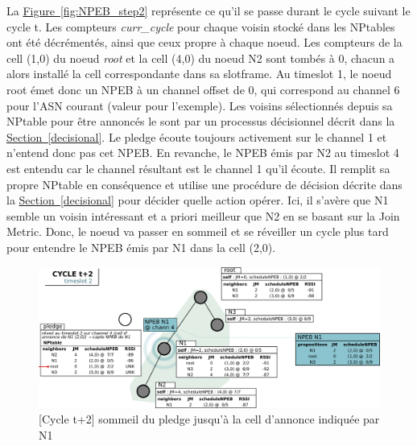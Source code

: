 \documentclass[]{report}
\newcommand{\wordlink}[2]{\hyperref[#2]{#1~\ref{#2}}}
\begin{document}
\newpage

La \wordlink{Figure}{fig:NPEB_step2} représente ce qu'il se passe durant le cycle suivant le cycle t. Les compteurs \textit{curr\_cycle} pour chaque voisin stocké dans les NPtables ont été décrémentés, ainsi que ceux propre à chaque noeud. Les compteurs de la cell (1,0) du noeud \textit{root} et la cell (4,0) du noeud N2 sont tombés à 0, chacun a alors installé la cell correspondante dans sa slotframe. Au timeslot 1, le noeud root émet donc un NPEB à un channel offset de 0, qui correspond au channel 6 pour l'ASN courant (valeur pour l'exemple). Les voisins sélectionnés depuis sa NPtable pour être annoncés le sont par un processus décisionnel décrit dans la \wordlink{Section}{decisional}. Le pledge écoute toujours activement sur le channel 1 et n'entend donc pas cet NPEB. En revanche, le NPEB émis par N2 au timeslot 4 est entendu car le channel résultant est le channel 1 qu'il écoute. Il remplit sa propre NPtable en conséquence et utilise une procédure de décision décrite dans la \wordlink{Section}{decisional} pour décider quelle action opérer. Ici, il s'avère que N1 semble un voisin intéressant et a priori meilleur que N2 en se basant sur la Join Metric. Donc, le noeud va passer en sommeil et se réveiller un cycle plus tard pour entendre le NPEB émis par N1 dans la cell (2,0).

 \vspace{1cm}
	\begin{figure}[!h]
	\centering
	\includegraphics[width=\linewidth]{NPEB_step3}
	\caption{[Cycle t+2] sommeil du pledge jusqu'à la cell d'annonce indiquée par N1}
	\label{fig:NPEB_step3}
	\end{figure}
\vspace{0.4cm}
\end{document}
